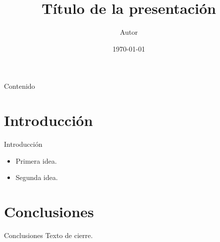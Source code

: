 \documentclass[aspectratio=169]{beamer}
\title{Título de la presentación}
\author{Autor}
\date{\today}
\begin{document}
\begin{frame}
  \titlepage
\end{frame}

\begin{frame}{Contenido}
  \tableofcontents
\end{frame}

\section{Introducción}
\begin{frame}{Introducción}
  \begin{itemize}
    \item Primera idea.
    \item Segunda idea.
  \end{itemize}
\end{frame}

\section{Conclusiones}
\begin{frame}{Conclusiones}
  Texto de cierre.
\end{frame}
\end{document}
